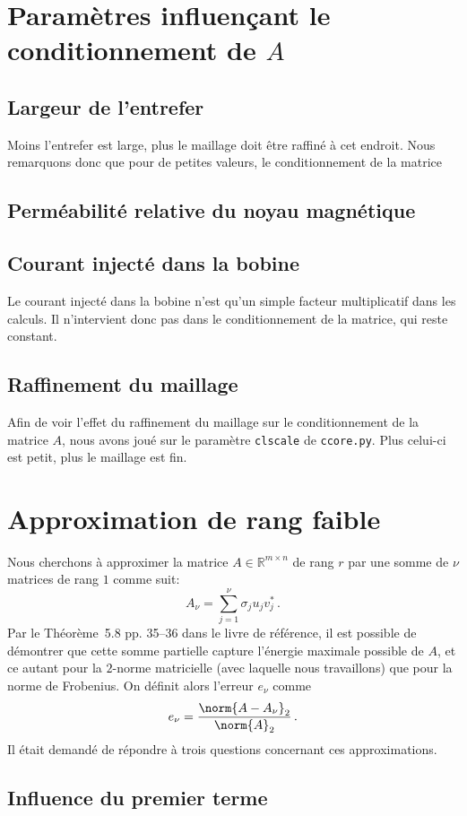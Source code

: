 \documentclass[11pt]{article}
\begin{document}
\section{Paramètres influençant le conditionnement de $A$}
\subsection{Largeur de l'entrefer}
Moins l'entrefer est large, plus le maillage doit être raffiné à cet endroit.
Nous remarquons donc que pour de petites valeurs,
le conditionnement de la matrice 
\subsection{Perméabilité relative du noyau magnétique}
\subsection{Courant injecté dans la bobine}
Le courant injecté dans la bobine n'est qu'un simple facteur multiplicatif dans les calculs.
Il n'intervient donc pas dans le conditionnement de la matrice, qui reste constant.
\subsection{Raffinement du maillage}
Afin de voir l'effet du raffinement du maillage sur le conditionnement de la matrice $A$, nous avons joué sur le paramètre \texttt{clscale} de \texttt{ccore.py}.
Plus celui-ci est petit, plus le maillage est fin.

\section{Approximation de rang faible}
Nous cherchons à approximer la matrice $A \in \mathbb{R}^{m \times n}$ de rang $r$ par une somme de $\nu$ matrices de rang $1$ comme suit:
\[
A_{\nu} = \sum_{j=1}^{\nu} \sigma_{j} u_{j} v^*_{j}\,. 
\] 
Par le Théorème~5.8 pp. 35--36 dans le livre de référence, il est possible de démontrer que cette somme partielle capture l'énergie maximale possible de $A$, et ce autant pour la $2$-norme matricielle (avec laquelle nous travaillons) que pour la norme de Frobenius.
On définit alors l'erreur $e_{\nu}$ comme
\[
e_{\nu} = \frac{\norm{A - A_{\nu}}_2}{\norm{A}_2}\,.
\]
Il était demandé de répondre à trois questions concernant ces approximations.
\subsection{Influence du premier terme}
\end{document}

